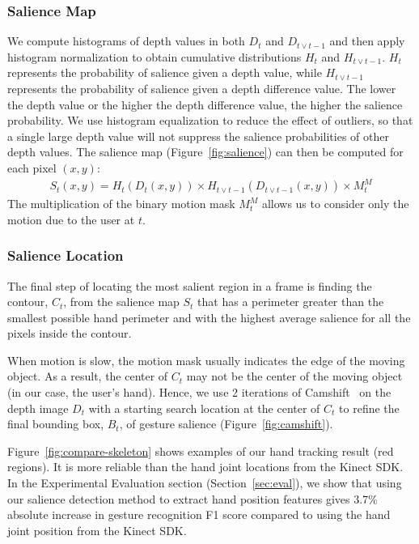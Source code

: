 \subsubsection{Salience Map}
We compute histograms of depth values in both $D_t$ and $D_{t\vee t-1}$ and then apply histogram normalization to obtain cumulative distributions $H_t$ and $H_{t\vee t-1}$.
$H_t$ represents the probability of salience given a depth value, while $H_{t\vee t-1}$ represents the probability of salience given
a depth difference value. The lower the depth value or the higher the depth difference value, the higher the salience probability. We use
histogram equalization to reduce the effect of outliers, so that a single large depth value will not suppress the salience probabilities of other depth values.
The salience map (Figure~\ref{fig:salience}) can then be computed for each pixel $(x, y)$:
\begin{align*}
S_t(x, y) = H_t(D_t(x, y)) \times H_{t\vee t-1}(D_{t\vee t-1}(x, y)) \times M_t^M
\end{align*}
The multiplication of the binary motion mask $M_t^M$ allows us to consider only the motion due to the user at $t$.

\subsubsection{Salience Location}
The final step of locating the most salient region in a frame is finding the
contour, $C_t$, from the salience map $S_t$ that has a perimeter greater than
the smallest possible hand perimeter and with the highest average salience for all the pixels inside the contour.

When motion is slow, the motion mask usually indicates the edge of the moving
object. As a result, the center of $C_t$ may not be the center of the moving
object (in our case, the user's hand). Hence, we use 2 iterations of Camshift~\cite{Bradski98} on
the depth image $D_t$ with a starting search location at the center of $C_t$ to refine
the final bounding box, $B_t$, of gesture salience (Figure~\ref{fig:camshift}).

Figure~\ref{fig:compare-skeleton} shows examples of our hand tracking result (red regions).
It is more reliable than the hand joint locations from the Kinect SDK. In the
Experimental Evaluation section (Section~\ref{sec:eval}), we show that using our
salience detection method to extract hand position features gives 3.7\%
absolute increase in gesture recognition F1 score compared to using the hand
joint position from the Kinect SDK.

